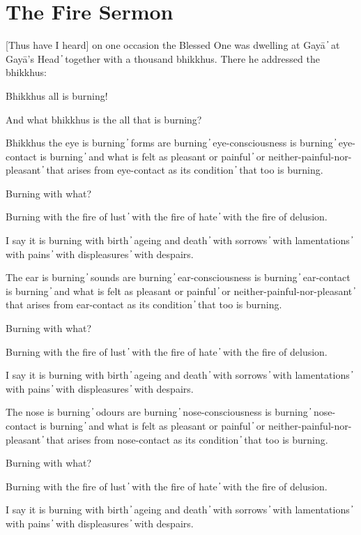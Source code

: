 \section{The Fire Sermon}

[Thus have I heard] on one occasion the Blessed One was dwelling at Gayā  ̓  at Gayā’s Head  ̓  together with a thousand bhikkhus. There he addressed the bhikkhus:

Bhikkhus all is burning!

And what bhikkhus is the all that is burning?

Bhikkhus the eye is burning  ̓  forms are burning  ̓  eye-consciousness is burning  ̓  eye-contact is burning  ̓  and what is felt as pleasant or painful  ̓  or neither-painful-nor-pleasant  ̓  that arises from eye-contact as its condition  ̓  that too is burning.

Burning with what?

Burning with the fire of lust  ̓  with the fire of hate  ̓  with the fire of delusion.

I say it is burning with birth  ̓  ageing and death  ̓  with sorrows  ̓  with lamentations  ̓  with pains  ̓  with displeasures  ̓  with despairs.

The ear is burning  ̓  sounds are burning  ̓  ear-consciousness is burning  ̓  ear-contact is burning  ̓  and what is felt as pleasant or painful  ̓  or neither-painful-nor-pleasant  ̓  that arises from ear-contact as its condition  ̓  that too is burning.

Burning with what?

Burning with the fire of lust  ̓  with the fire of hate  ̓  with the fire of delusion.

I say it is burning with birth  ̓  ageing and death  ̓  with sorrows  ̓  with lamentations  ̓  with pains  ̓  with displeasures  ̓  with despairs.

The nose is burning  ̓  odours are burning  ̓  nose-consciousness is burning  ̓  nose-contact is burning  ̓  and what is felt as pleasant or painful  ̓  or neither-painful-nor-pleasant  ̓  that arises from nose-contact as its condition  ̓  that too is burning.

Burning with what?

Burning with the fire of lust  ̓  with the fire of hate  ̓  with the fire of delusion.

I say it is burning with birth  ̓  ageing and death  ̓  with sorrows  ̓  with lamentations  ̓  with pains  ̓  with displeasures  ̓  with despairs.


